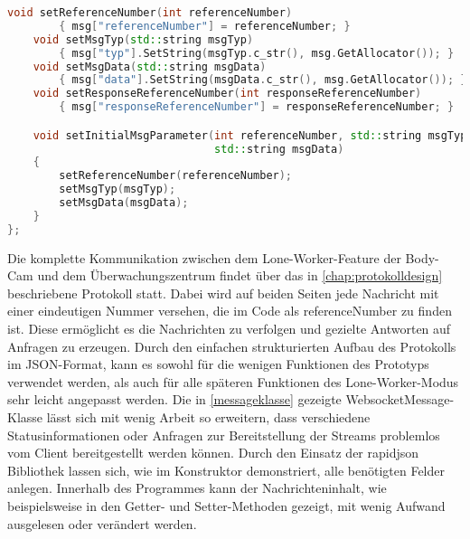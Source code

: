 \documentclass[thesis.tex]{subfiles}
\begin{document}
\begin{lstlisting}[caption={Nachrichtenklasse im Prototypen},captionpos=b,language=C++,label=messageklasse]
    void setReferenceNumber(int referenceNumber)
        { msg["referenceNumber"] = referenceNumber; }
    void setMsgTyp(std::string msgTyp)
        { msg["typ"].SetString(msgTyp.c_str(), msg.GetAllocator()); }
    void setMsgData(std::string msgData)
        { msg["data"].SetString(msgData.c_str(), msg.GetAllocator()); }
    void setResponseReferenceNumber(int responseReferenceNumber)
        { msg["responseReferenceNumber"] = responseReferenceNumber; }

    void setInitialMsgParameter(int referenceNumber, std::string msgTyp,
                                std::string msgData)
    {
        setReferenceNumber(referenceNumber);
        setMsgTyp(msgTyp);
        setMsgData(msgData);
    }
};
\end{lstlisting}

Die komplette Kommunikation zwischen dem Lone-Worker-Feature der Body-Cam und dem Überwachungszentrum findet über das in \autoref{chap:protokolldesign} beschriebene Protokoll statt.
Dabei wird auf beiden Seiten jede Nachricht mit einer eindeutigen Nummer versehen, die im Code als referenceNumber zu finden ist.
Diese ermöglicht es die Nachrichten zu verfolgen und gezielte Antworten auf Anfragen zu erzeugen.
Durch den einfachen strukturierten Aufbau des Protokolls im JSON-Format, kann es sowohl für die wenigen Funktionen des Prototyps verwendet werden, als auch für alle späteren Funktionen des Lone-Worker-Modus sehr leicht angepasst werden.
Die in \autoref{messageklasse} gezeigte WebsocketMessage-Klasse lässt sich mit wenig Arbeit so erweitern, dass verschiedene Statusinformationen oder Anfragen zur Bereitstellung der Streams problemlos vom Client bereitgestellt werden können.
Durch den Einsatz der rapidjson Bibliothek lassen sich, wie im Konstruktor demonstriert, alle benötigten Felder anlegen.
Innerhalb des Programmes kann der Nachrichteninhalt, wie beispielsweise in den Getter- und Setter-Methoden gezeigt, mit wenig Aufwand ausgelesen oder verändert werden.
\end{document}
